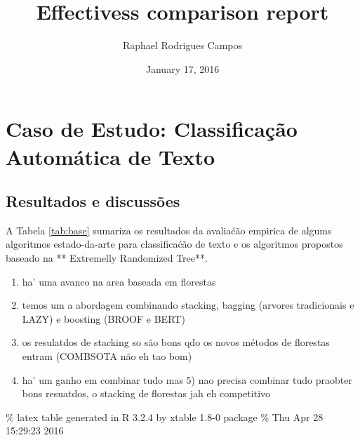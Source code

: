 \documentclass[]{article}
\title{Effectivess comparison report}
\author{Raphael Rodrigues Campos}
\date{January 17, 2016}
\begin{document}
\maketitle


\section{Caso de Estudo: Classificação Automática de
Texto}\label{caso-de-estudo-classificacao-automatica-de-texto}

\subsection{Resultados e discussões}\label{resultados-e-discussoes}

A Tabela \ref{tab:base} sumariza os resultados da avaliaćão empirica de
algums algoritmos estado-da-arte para classificaćão de texto e os
algoritmos propostos baseado na ** Extremelly Randomized Tree**.

\begin{enumerate}
\def\labelenumi{\arabic{enumi})}
\itemsep1pt\parskip0pt
\item
  ha' uma avanco na area baseada em florestas
\item
  temos um a abordagem combinando stacking, bagging (arvores
  tradicionais e LAZY) e boosting (BROOF e BERT)
\item
  os resulatdos de stacking so são bons qdo os novos métodos de
  florestas entram (COMBSOTA não eh tao bom)
\item
  ha' um ganho em combinar tudo mas 5) nao precisa combinar tudo
  praobter bons resuatdos, o stacking de florestas jah eh competitivo
\end{enumerate}

\% latex table generated in R 3.2.4 by xtable 1.8-0 package \% Thu Apr
28 15:29:23 2016
\end{document}
